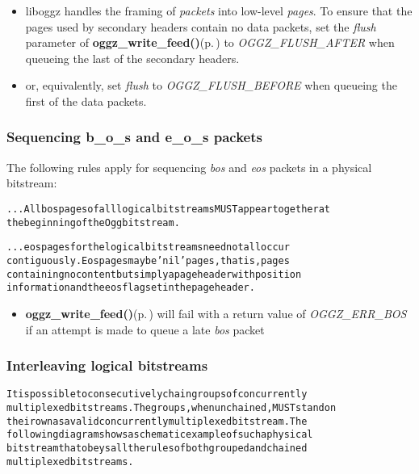 \begin{itemize}
\item liboggz handles the framing of {\em packets\/} into low-level {\em pages\/}. To ensure that the pages used by secondary headers contain no data packets, set the {\em flush\/} parameter of {\bf oggz\_\-write\_\-feed()}{\rm (p.\,\pageref{group__write__api_a2})} to {\em OGGZ\_\-FLUSH\_\-AFTER\/} when queueing the last of the secondary headers.\item or, equivalently, set {\em flush\/} to {\em OGGZ\_\-FLUSH\_\-BEFORE\/} when queueing the first of the data packets.\end{itemize}
\subsubsection{Sequencing b\_\-o\_\-s and e\_\-o\_\-s packets}\label{boseosseq}
The following rules apply for sequencing {\em bos\/} and {\em eos\/} packets in a physical bitstream: \small\begin{alltt}
   ... All bos pages of all logical bitstreams MUST appear together at
   the beginning of the Ogg bitstream.\end{alltt}\normalsize 


\small\begin{alltt}   ... eos pages for the logical bitstreams need not all occur
   contiguously.  Eos pages may be 'nil' pages, that is, pages
   containing no content but simply a page header with position
   information and the eos flag set in the page header.
\end{alltt}\normalsize 


\begin{itemize}
\item {\bf oggz\_\-write\_\-feed()}{\rm (p.\,\pageref{group__write__api_a2})} will fail with a return value of {\em OGGZ\_\-ERR\_\-BOS\/} if an attempt is made to queue a late {\em bos\/} packet\end{itemize}
\subsubsection{Interleaving logical bitstreams}\label{interleaving}
\small\begin{alltt}
   It is possible to consecutively chain groups of concurrently
   multiplexed bitstreams.  The groups, when unchained, MUST stand on
   their own as a valid concurrently multiplexed bitstream.  The
   following diagram shows a schematic example of such a physical
   bitstream that obeys all the rules of both grouped and chained
   multiplexed bitstreams.\end{alltt}\normalsize 


